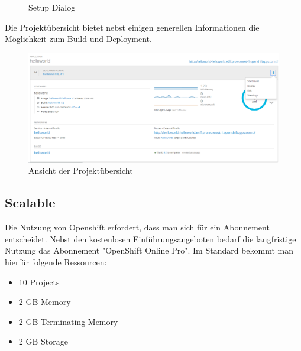 \documentclass[12pt,a4paper]{article}
\begin{document}
\begin{figure}%
    \centering
    \qquad
    \caption{Setup Dialog}%
    \label{fig:os-setup}%
\end{figure}

Die Projektübersicht bietet nebst einigen generellen Informationen die Möglichkeit zum Build und Deployment.

\begin{figure}[h]
	\centering
	\includegraphics[width=0.7\linewidth]{img/os-project-overview}
	\caption{Ansicht der Projektübersicht}
	\label{fig:os-project-overview}
\end{figure}

\subsection{Scalable}

Die Nutzung von Openshift erfordert, dass man sich für ein Abonnement entscheidet. Nebst den kostenlosen Einführungsangeboten bedarf die langfristige Nutzung das Abonnement "OpenShift Online Pro". Im Standard bekommt man hierfür folgende Ressourcen:

\begin{itemize}
	\item 10 Projects
	\item 2 GB Memory
	\item 2 GB Terminating Memory
	\item 2 GB Storage
\end{itemize}
\end{document}
